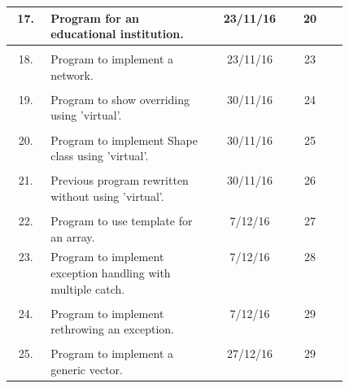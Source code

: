 \documentclass[a4paper,11pt]{article}
\begin{document}
\begin{tabular}{|c|p{0.48\linewidth}|c|c|c|}
\\17.&Program for an educational institution.& 23/11/16 & 20 &\\ \hline
\\18.&Program to implement a network.& 23/11/16 & 23 &\\ \hline
\\19.&Program to show overriding using 'virtual'.& 30/11/16 & 24 &\\ \hline
\\20.&Program to implement Shape class using 'virtual'.& 30/11/16 & 25 &\\ \hline
\\21.&Previous program rewritten without using 'virtual'.& 30/11/16 & 26 &\\ \hline
\\22.&Program to use template for an array.& 7/12/16 & 27 &\\ \hline
23.&Program to implement exception handling with multiple catch.& 7/12/16 & 28 &\\ \hline
\\24.&Program to implement rethrowing an exception.& 7/12/16 & 29 &\\ \hline
\\25.&Program to implement a generic vector.& 27/12/16 & 29 &\\ \hline
\end{tabular}
\end{document}
